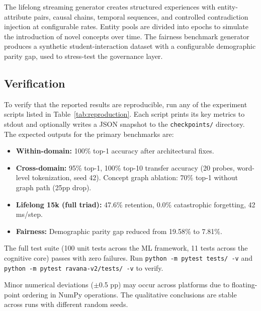 \documentclass[11pt]{article}
\begin{document}
The lifelong streaming generator creates structured experiences with entity-attribute pairs, causal chains, temporal sequences, and controlled contradiction injection at configurable rates. Entity pools are divided into epochs to simulate the introduction of novel concepts over time. The fairness benchmark generator produces a synthetic student-interaction dataset with a configurable demographic parity gap, used to stress-test the governance layer.

\subsection{Verification}
To verify that the reported results are reproducible, run any of the experiment scripts listed in Table~\ref{tab:reproduction}. Each script prints its key metrics to stdout and optionally writes a JSON snapshot to the \texttt{checkpoints/} directory. The expected outputs for the primary benchmarks are:

\begin{itemize}[leftmargin=*]
    \item \textbf{Within-domain:} 100\% top-1 accuracy after architectural fixes.
    \item \textbf{Cross-domain:} 95\% top-1, 100\% top-10 transfer accuracy (20 probes, word-level tokenization, seed 42). Concept graph ablation: 70\% top-1 without graph path (25pp drop).
    \item \textbf{Lifelong 15k (full triad):} 47.6\% retention, 0.0\% catastrophic forgetting, 42 ms/step.
    \item \textbf{Fairness:} Demographic parity gap reduced from 19.58\% to 7.81\%.
\end{itemize}

The full test suite (100 unit tests across the ML framework, 11 tests across the cognitive core) passes with zero failures. Run \texttt{python -m pytest tests/ -v} and \texttt{python -m pytest ravana-v2/tests/ -v} to verify.

Minor numerical deviations ($\pm$0.5 pp) may occur across platforms due to floating-point ordering in NumPy operations. The qualitative conclusions are stable across runs with different random seeds.
\end{document}
